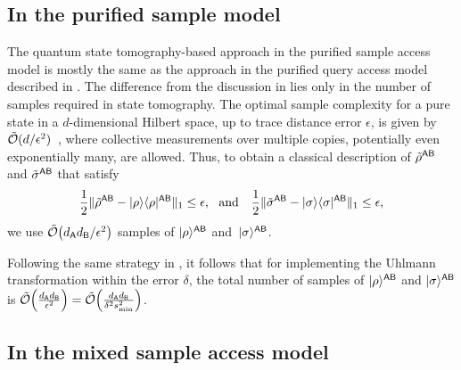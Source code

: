 





\subsection{In the purified sample model}
\label{sec:tomography based purif sample}

The quantum state tomography-based approach in the purified sample access model is mostly the same as the approach in the purified query access model described in .
The difference from the discussion in  lies only in the number of samples required in state tomography.
The optimal sample complexity for a pure state in a $d$-dimensional Hilbert space, up to trace distance error $\epsilon$, is given by $\tilde{{\mathcal{O}}}(d/\epsilon^2)$~\cite{ODonnell2016EffTomo, Haah2017samploptTomo}, where collective measurements over multiple copies, potentially even exponentially many, are allowed.
Thus, to obtain a classical description of $\tilde{\rho}^{{\mathsf{A}}{\mathsf{B}}}$ and $\tilde{\sigma}^{{\mathsf{A}}{\mathsf{B}}}$ that satisfy 
\begin{align}
\label{eq:tomography descp. error 2}
    \f{1}{2}\|\til{\rho}^{\sA\sB} - \ketbra{\rho}{\rho}^{\sA\sB}\|_1 \leq \epsilon, \ \ \text{and} \ \ \ 
    \f{1}{2}\|\til{\sigma}^{\sA\sB} - \ketbra{\sigma}{\sigma}^{\sA\sB}\|_1 \leq \epsilon,
\end{align}
we use $\tilde{{\mathcal{O}}}\big(d_{\mathsf{A}} d_{\mathsf{B}}/\epsilon^2\big)$ samples of $|\rho\rangle^{{\mathsf{A}}{\mathsf{B}}}$ and~$|\sigma\rangle^{{\mathsf{A}}{\mathsf{B}}}$.

Following the same strategy in , it follows that for implementing the Uhlmann transformation within the error $\delta$, the total number of samples of $|\rho\rangle^{{\mathsf{A}}{\mathsf{B}}}$ and $|\sigma\rangle^{{\mathsf{A}}{\mathsf{B}}}$ is $\tilde{{\mathcal{O}}}\Big(\frac{d_{\mathsf{A}} d_{\mathsf{B}}}{\epsilon^2}\Big) 
    = \tilde{{\mathcal{O}}}\Big(\frac{d_{\mathsf{A}} d_{\mathsf{B}}}{\delta^2 s_{\rm min}^2}\Big)$.









\subsection{In the mixed sample access model}
\label{sec:tomography based mixed sample}


